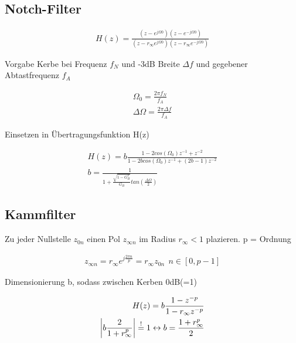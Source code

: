 \documentclass[10pt,a4paper]{article}
\begin{document}
\subsection{Notch-Filter}
  \begin{mdframed}[style=exercise]
    \begin{align}
        H(z)=\frac{(z-e^{j\Omega 0})(z-e^{-j\Omega 0})}{(z-r_{\infty}e^{j\Omega 0})(z-r_{\infty}e^{-j\Omega 0})}
    \end{align}
  \end{mdframed}
Vorgabe Kerbe bei Frequenz $f_N$ und -3dB Breite $\Delta f$ und gegebener Abtastfrequenz $f_A$
  \begin{mdframed}[style=exercise]
    \begin{align}
        \Omega_0=\frac{2\pi f_N}{f_A}\\
        \Delta\Omega=\frac{2\pi\Delta f}{f_A}
    \end{align}
  \end{mdframed}
Einsetzen in Übertragungsfunktion H(z) 
  \begin{mdframed}[style=exercise]
    \begin{align}
        H(z)=b\frac{1-2cos(\Omega_0)z^{-1}+z^{-2}}{1-2bcos(\Omega_0)z^{-1}+(2b-1)z^{-2}}\\
        b=\frac{1}{1+\frac{\sqrt{1-G_B^2}}{G_B}tan(\frac{\Delta\Omega}{2})}
    \end{align}
  \end{mdframed}
\subsection{Kammfilter}
Zu jeder Nullstelle $z_{0n}$ einen Pol $z_{\infty n}$ im Radius $r_\infty<1$ plazieren. p = Ordnung
  \begin{mdframed}[style=exercise]
    \begin{align}
        z_{\infty n} = r_\infty e^{j\frac{2\pi n}{p}} = r_\infty z_{0n} \ \ n\in[0,p-1]
    \end{align}
  \end{mdframed}
Dimensionierung b, sodass zwischen Kerben 0dB(=1)
  \begin{mdframed}[style=exercise]
    \begin{align}
        H(z)=b\frac{1-z^{-p}}{1-r_\infty z^{-p}}\\
        \abs{b\frac{2}{1+r_\infty^p}}\stackrel{!}{=}1 \leftrightarrow b=\frac{1+r_\infty ^p}{2}
    \end{align}
  \end{mdframed}
\end{document}
